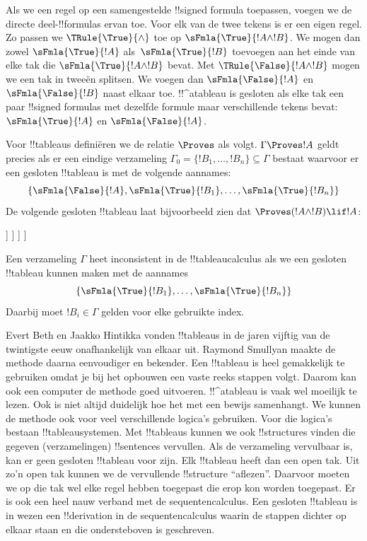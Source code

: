 \documentclass[openany]{memoir}
\begin{document}
Als we een regel op een samengestelde !!{signed formula} toepassen,
voegen we de directe deel-!!{formula}s ervan toe. Voor elk van de twee
tekens is er een eigen regel. Zo passen we $\TRule{\True}{\land}$ toe
op $\sFmla{\True}{!A \land !B}$. We mogen dan zowel
$\sFmla{\True}{!A}$ als~$\sFmla{\True}{!B}$ toevoegen aan het einde
van elke tak die $\sFmla{\True}{!A \land !B}$ bevat. Met
$\TRule{\False}{!A \land !B}$ mogen we een tak in tweeën splitsen. We
voegen dan $\sFmla{\False}{!A}$ en $\sFmla{\False}{!B}$ naast elkaar
toe. !!^a{tableau} is gesloten als elke tak een paar !!{signed formula}s
met dezelfde formule maar verschillende tekens bevat:
$\sFmla{\True}{!A}$ en $\sFmla{\False}{!A}$.

Voor !!{tableau}s definiëren we de relatie $\Proves$ als volgt.
$\Gamma \Proves !A$ geldt precies als er een eindige verzameling
$\Gamma_0 = \{!B_1, \dots, !B_n\} \subseteq \Gamma$ bestaat waarvoor
er een gesloten !!{tableau} is met de volgende aannames:
\[
\{\sFmla{\False}{!A}, \sFmla{\True}{!B_1}, \dots, \sFmla{\True}{!B_n}\} 
\]
De volgende gesloten !!{tableau} laat bijvoorbeeld zien dat $\Proves
(!A \land !B) \lif !A$:
\begin{oltableau}
  [\sFmla{\False}{(\formula{A} \land \formula{B}) \lif \formula{A}}, just = \TAss
    [\sFmla{\True}{\formula{A} \land \formula{B}}, just = {\TRule{\False}{\lif}[1]}
      [\sFmla{\False}{\formula{A}}, just = {\TRule{\False}{\lif}[1]}
        [\sFmla{\True}{\formula{A}}, just = {\TRule{\True}{\lif}[2]}
          [\sFmla{\True}{\formula{B}}, just = {\TRule{\True}{\lif}[2]}, close]
        ]
      ]
    ]
  ]
\end{oltableau}

Een verzameling $\Gamma$ heet inconsistent in de !!{tableau}calculus als
we een gesloten !!{tableau} kunnen maken met de aannames
\[
\{\sFmla{\True}{!B_1}, \dots, \sFmla{\True}{!B_n}\} 
\]
Daarbij moet $!B_i \in \Gamma$ gelden voor elke gebruikte index.

Evert Beth en Jaakko Hintikka vonden !!{tableau}s in de jaren vijftig
van de twintigste eeuw onafhankelijk van elkaar uit. Raymond Smullyan
maakte de methode daarna eenvoudiger en bekender. Een !!{tableau} is
heel gemakkelijk te gebruiken omdat je bij het opbouwen een vaste reeks
stappen volgt. Daarom kan ook een computer de methode goed uitvoeren.
!!^a{tableau} is vaak wel moeilijk te lezen. Ook is
niet altijd duidelijk hoe het met een bewijs samenhangt. We kunnen de
methode ook voor veel verschillende logica's gebruiken. Voor die
logica's bestaan !!{tableau}systemen. Met !!{tableau}s kunnen we ook
!!{structure}s
vinden die gegeven (verzamelingen) !!{sentence}s vervullen. Als de
verzameling vervulbaar is, kan er geen gesloten !!{tableau} voor zijn.
Elk !!{tableau} heeft dan een open tak. Uit zo'n open tak kunnen we de
vervullende !!{structure} ``aflezen''. Daarvoor moeten we op die tak
wel elke regel hebben toegepast die erop kon worden toegepast. Er is
ook een heel nauw verband met de sequentencalculus. Een gesloten
!!{tableau} is in wezen een !!{derivation} in de sequentencalculus
waarin de stappen dichter op elkaar staan en die ondersteboven is
geschreven.
\endgroup
\end{document}
